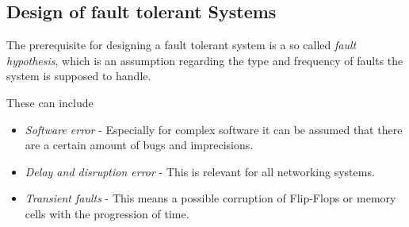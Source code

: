 \subsection{Design of fault tolerant Systems}
The prerequisite for designing a fault tolerant system is a so called \emph{fault hypothesis}, which is an assumption regarding the type and frequency of faults the system is supposed to handle.

These can include
\begin{itemize}
\item \emph{Software error} - Especially for complex software it can be assumed that there are a certain amount of bugs and imprecisions.
\item \emph{Delay and disruption error} - This is relevant for all networking systems.
\item \emph{Transient faults} - This means a possible corruption of Flip-Flops or memory cells with the progression of time.
\end{itemize}
